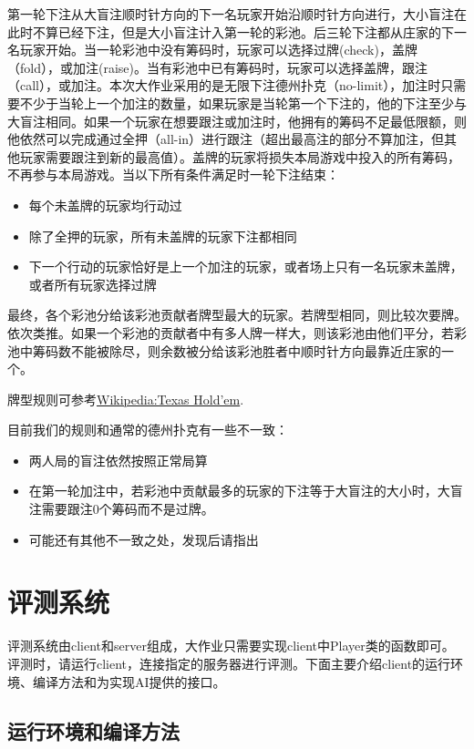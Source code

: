 \documentclass[11pt, fleqn, a4paper]{article}
\begin{document}
第一轮下注从大盲注顺时针方向的下一名玩家开始沿顺时针方向进行，大小盲注在此时不算已经下注，但是大小盲注计入第一轮的彩池。后三轮下注都从庄家的下一名玩家开始。当一轮彩池中没有筹码时，玩家可以选择过牌(check)，盖牌（fold），或加注(raise)。当有彩池中已有筹码时，玩家可以选择盖牌，跟注（call），或加注。本次大作业采用的是无限下注德州扑克（no-limit），加注时只需要不少于当轮上一个加注的数量，如果玩家是当轮第一个下注的，他的下注至少与大盲注相同。如果一个玩家在想要跟注或加注时，他拥有的筹码不足最低限额，则他依然可以完成通过全押（all-in）进行跟注（超出最高注的部分不算加注，但其他玩家需要跟注到新的最高值）。盖牌的玩家将损失本局游戏中投入的所有筹码，不再参与本局游戏。当以下所有条件满足时一轮下注结束：
\begin{itemize}
	\item 每个未盖牌的玩家均行动过
	\item 除了全押的玩家，所有未盖牌的玩家下注都相同
	\item 下一个行动的玩家恰好是上一个加注的玩家，或者场上只有一名玩家未盖牌，或者所有玩家选择过牌
\end{itemize}

最终，各个彩池分给该彩池贡献者牌型最大的玩家。若牌型相同，则比较次要牌。依次类推。如果一个彩池的贡献者中有多人牌一样大，则该彩池由他们平分，若彩池中筹码数不能被除尽，则余数被分给该彩池胜者中顺时针方向最靠近庄家的一个。

牌型规则可参考\href{http://zh.wikipedia.org/zh-cn/%E5%BE%B7%E5%B7%9E%E6%92%B2%E5%85%8B#.E7.89.8C.E5.9E.8B.E5.A4.A7.E5.B0.8F.E8.A7.84.E5.88.99}{Wikipedia:Texas Hold'em}.

目前我们的规则和通常的德州扑克有一些不一致：
\begin{itemize}
	\item 两人局的盲注依然按照正常局算
	\item 在第一轮加注中，若彩池中贡献最多的玩家的下注等于大盲注的大小时，大盲注需要跟注0个筹码而不是过牌。
	\item 可能还有其他不一致之处，发现后请指出
\end{itemize}

\section{评测系统}
\label{sec:test}

评测系统由client和server组成，大作业只需要实现client中Player类的函数即可。评测时，请运行client，连接指定的服务器进行评测。下面主要介绍client的运行环境、编译方法和为实现AI提供的接口。

\subsection{运行环境和编译方法}
\end{document}
